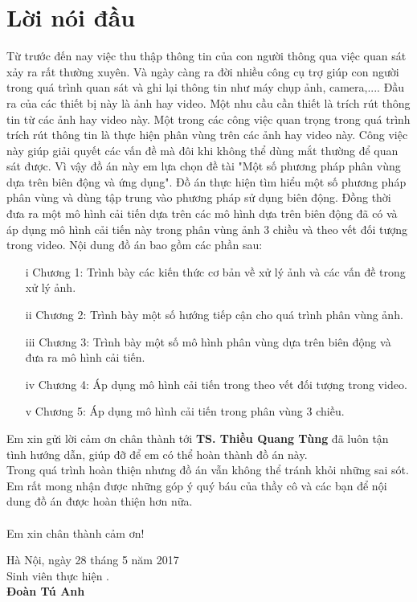 \documentclass[14pt,oneside,a4paper]{extreport}
\begin{document}
%
\chapter*{Lời nói đầu}
Từ trước đến nay việc thu thập thông tin của con người thông qua việc quan sát xảy ra rất thường xuyên. Và ngày càng ra đời nhiều công cụ trợ giúp con người trong quá trình quan sát và ghi lại thông tin như máy chụp ảnh, camera,.... Đầu ra của các thiết bị này là ảnh hay video. Một nhu cầu cần thiết là trích rút thông tin từ các ảnh hay video này. Một trong các công việc quan trọng trong quá trình trích rút thông tin là thực hiện phân vùng trên các ảnh hay video này. Công việc này giúp giải quyết các vấn đề mà đôi khi không thể dùng mắt thường để quan sát được. Vì vậy đồ án này em lựa chọn đề tài "Một số phương pháp phân vùng dựa trên biên động và ứng dụng".  Đồ án thực hiện tìm hiểu một số phương pháp phân vùng và dùng tập trung vào phương pháp sử dụng biên động. Đồng thời đưa ra một mô hình cải tiến dựa trên các mô hình dựa trên biên động đã có và áp dụng mô hình cải tiến này trong phân vùng ảnh 3 chiều và  theo vết đối tượng trong video. Nội dung đồ án bao gồm  các phần sau:
\begin{itemize}
\item[i] Chương 1: Trình bày các kiến thức cơ bản về xử lý ảnh và các vấn đề trong xử lý ảnh.
\item[ii] Chương 2: Trình bày một số hướng tiếp cận cho quá trình phân vùng ảnh.
\item[iii] Chương 3: Trình bày một số mô hình phân vùng dựa trên biên động và đưa ra mô hình cải tiến.
\item[iv] Chương 4: Áp dụng mô hình cải tiến trong theo vết đối tượng trong video.
\item[v] Chương 5: Áp dụng mô hình cải tiến trong phân vùng 3 chiều.
\end{itemize}
 Em xin gửi lời cảm ơn chân thành  tới {\bf TS. Thiều Quang Tùng} đã luôn tận tình hướng dẫn, giúp đỡ để em có thể hoàn thành đồ án này.\\
Trong quá trình hoàn thiện nhưng đồ án vẫn không thể tránh khỏi những sai sót. Em rất mong nhận được những góp ý quý báu của thầy cô và các bạn để nội dung đồ án được hoàn thiện hơn nữa.\\\\
Em xin chân thành cảm ơn!\\


\begin{flushright}
Hà Nội, ngày 28 tháng 5 năm 2017\\[0.5cm]
{Sinh viên thực hiện \hspace*{1.4cm}.}\\[0.1cm]
\textbf{Đoàn Tú Anh\hspace*{2.0cm}}
\end{flushright}
\tableofcontents
\newpage
\listoffigures
\newpage
\newpage
\end{document}
